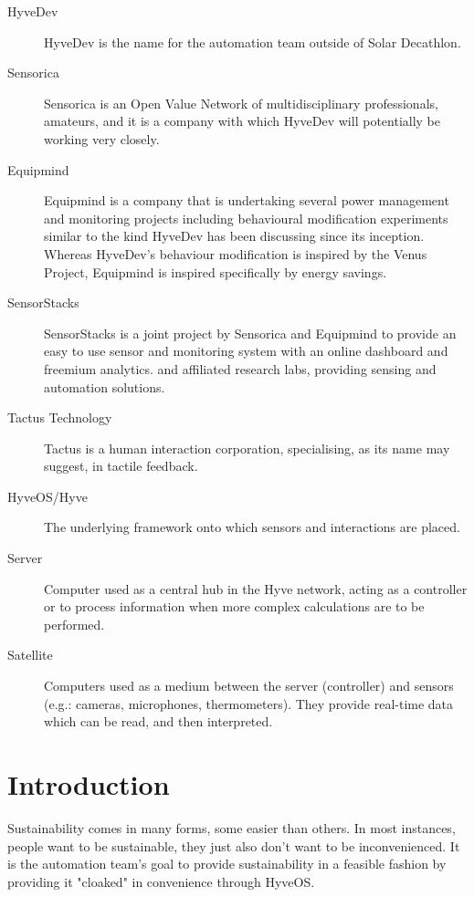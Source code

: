 	\begin{description}
		\item[HyveDev] HyveDev is the name for the automation team outside of Solar Decathlon.
		
		\item[Sensorica] Sensorica is an Open Value Network of multidisciplinary professionals, amateurs, and it is a company with which HyveDev will potentially be working very closely.
		
		\item[Equipmind] Equipmind is a company that is undertaking several power management and monitoring projects including behavioural modification experiments similar to the kind HyveDev has been discussing since its inception.  Whereas HyveDev's behaviour modification is inspired by the Venus Project, Equipmind is inspired specifically by energy savings.
		
		\item[SensorStacks] SensorStacks is a joint project by Sensorica and Equipmind to provide an easy to use sensor and monitoring system with an online dashboard and freemium analytics.
		and affiliated research labs, providing sensing and automation solutions.
		
		\item[Tactus Technology] Tactus is a human interaction corporation, specialising, as its name may suggest, in tactile feedback.
		
		\item[HyveOS/Hyve] The underlying framework onto which sensors and interactions are placed.
		
		\item[Server] Computer used as a central hub in the Hyve network, acting as a controller or to process information when more complex calculations are to be performed.
		
		\item[Satellite] Computers used as a medium between the server (controller) and sensors (e.g.: cameras, microphones, thermometers). They provide real-time data which can be read, and then interpreted.
	\end{description}

\section{Introduction}

	Sustainability comes in many forms, some easier than others.
	In most instances, people want to be sustainable, they just also don't want to be inconvenienced.
	It is the automation team's goal to provide sustainability in a feasible fashion by providing it "cloaked" in convenience through HyveOS.
	
